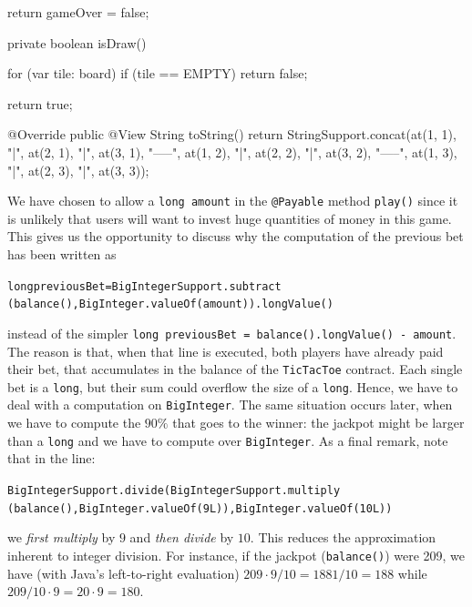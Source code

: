 \begin{codebox}
\begin{javalst}
{{    return gameOver = false;
  }

  private boolean isDraw() {
    for (var tile: board)
      if (tile == EMPTY)
        return false;

    return true;
  }

  @Override
  public @View String toString() {
    return StringSupport.concat(at(1, 1), "|", at(2, 1), "|", at(3, 1),
      "\n-----\n", at(1, 2), "|", at(2, 2), "|", at(3, 2),
      "\n-----\n", at(1, 3), "|", at(2, 3), "|", at(3, 3));
  }
}    
\end{javalst}\end{codebox}

\begin{commentbox}
  We have chosen to allow a \texttt{long amount} in the \texttt{@Payable}
  method \texttt{play()} since
  it is unlikely that users will want to invest huge quantities of money in this
  game. This gives us the opportunity to discuss why the computation of the
  previous bet has been written as
  \begin{center}\begin{alltt}
    long previousBet = BigIntegerSupport.subtract
      (balance(), BigInteger.valueOf(amount)).longValue()
  \end{alltt}\end{center}
  instead of the simpler
  \texttt{long previousBet = balance().longValue() - amount}.
  The reason is that, when that line is executed, both players have already paid
  their bet, that accumulates in the balance of the \texttt{TicTacToe} contract.
  Each single bet is a \texttt{long}, but their sum could overflow the size of a \texttt{long}.
  Hence, we have to deal with a computation on \texttt{BigInteger}. The same situation
  occurs later, when we have to compute the $90\%$ that goes to the winner:
  the jackpot might be larger than a \texttt{long} and we have to compute over
  \texttt{BigInteger}. As a final remark, note that in the line:
  \begin{center}\begin{alltt}
      BigIntegerSupport.divide(BigIntegerSupport.multiply
        (balance(), BigInteger.valueOf(9L)), BigInteger.valueOf(10L))
  \end{alltt}\end{center}
  we \emph{first multiply} by $9$ and \emph{then divide} by $10$. This reduces the
  approximation inherent to integer division. For instance, if the jackpot
  (\texttt{balance()}) were 209, we have (with Java's left-to-right evaluation)
  $209\cdot 9/10=1881/10=188$ while $209/10\cdot 9=20\cdot 9=180$.
\end{commentbox}


